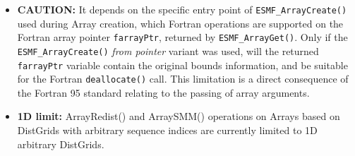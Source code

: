 
\begin{itemize}
\label{Array:rest}

\item {\bf CAUTION:} It depends on the specific entry point of {\tt ESMF\_ArrayCreate()} used during Array creation, which Fortran operations are supported on the Fortran array pointer {\tt farrayPtr}, returned by {\tt ESMF\_ArrayGet()}. Only if the {\tt ESMF\_ArrayCreate()} {\em from pointer} variant was used, will the returned {\tt farrayPtr} variable contain the original bounds information, and be suitable for the Fortran {\tt deallocate()} call. This limitation is a direct consequence of the Fortran 95 standard relating to the passing of array arguments.

\item {\bf 1D limit:} ArrayRedist() and ArraySMM() operations on Arrays based on DistGrids with arbitrary sequence indices are currently limited to 1D arbitrary DistGrids.

\end{itemize}
